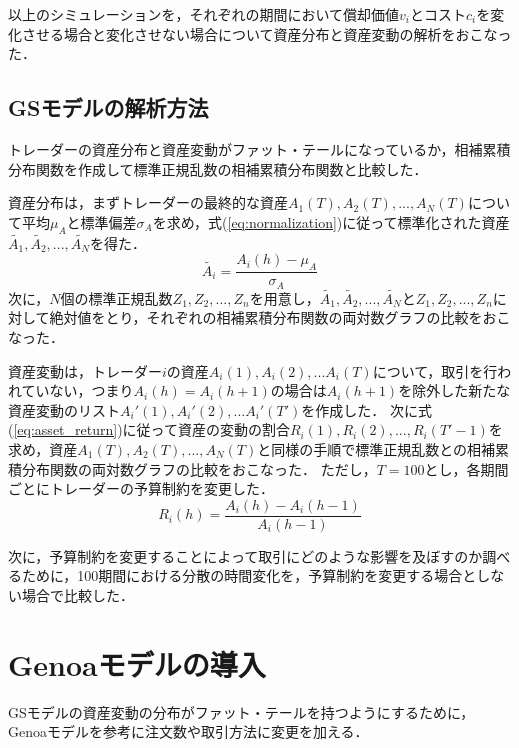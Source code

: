 \documentclass[titlepage]{jsreport}
\begin{document}
以上のシミュレーションを，それぞれの期間において償却価値$v_i$とコスト$c_i$を変化させる場合と変化させない場合について資産分布と資産変動の解析をおこなった．

\subsection{GSモデルの解析方法}
トレーダーの資産分布と資産変動がファット・テールになっているか，相補累積分布関数を作成して標準正規乱数の相補累積分布関数と比較した．

資産分布は，まずトレーダーの最終的な資産$A_1(T), A_2(T), ..., A_N(T)$について平均$\mu_A$と標準偏差$\sigma_A$を求め，式(\ref{eq:normalization})に従って標準化された資産$\tilde{A_1}, \tilde{A_2}, ..., \tilde{A_N}$を得た．
\begin{equation}
    \tilde{A_i} = \frac{A_i(h) - \mu_A}{\sigma_A} \label{eq:normalization}
\end{equation}
次に，$N$個の標準正規乱数$Z_1, Z_2, ..., Z_n$を用意し，$\tilde{A_1}, \tilde{A_2}, ..., \tilde{A_N}$と$Z_1, Z_2, ..., Z_n$に対して絶対値をとり，それぞれの相補累積分布関数の両対数グラフの比較をおこなった．

資産変動は，トレーダー$i$の資産$A_i(1), A_i(2), ...A_i(T)$について，取引を行われていない，つまり$A_i(h) = A_i(h + 1)$の場合は$A_i(h + 1)$を除外した新たな資産変動のリスト$A_i'(1), A_i'(2), ...A_i'(T')$を作成した．
次に式(\ref{eq:asset_return})に従って資産の変動の割合$R_i(1), R_i(2), ..., R_i(T' - 1)$を求め，資産$A_1(T), A_2(T), ..., A_N(T)$と同様の手順で標準正規乱数との相補累積分布関数の両対数グラフの比較をおこなった．
ただし，$T = 100$とし，各期間ごとにトレーダーの予算制約を変更した．
\begin{equation}
    R_i(h) = \frac{A_i(h)-A_i(h - 1)}{A_i(h - 1)} \label{eq:asset_return}
\end{equation}

次に，予算制約を変更することによって取引にどのような影響を及ぼすのか調べるために，100期間における分散の時間変化を，予算制約を変更する場合としない場合で比較した．

\section{Genoaモデルの導入}
GSモデルの資産変動の分布がファット・テールを持つようにするために，Genoaモデルを参考に注文数や取引方法に変更を加える．
\end{document}
